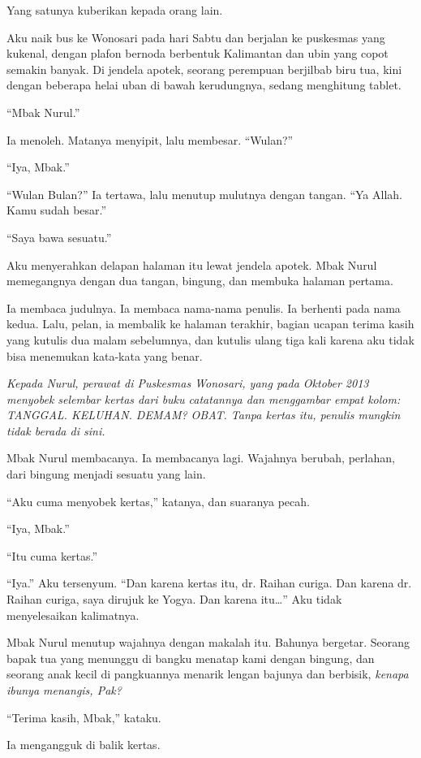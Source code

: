 \documentclass[11pt,twoside,openany]{book}
\makeatletter
\newcommand{\scenebreak}{\par\vspace{0.9em}{\centering\textsc{*\hspace{0.7em}*\hspace{0.7em}*}\par}\vspace{0.9em}\@afterindentfalse\@afterheading}
\makeatother
\begin{document}
\scenebreak
Yang satunya kuberikan kepada orang lain.

Aku naik bus ke Wonosari pada hari Sabtu dan berjalan ke puskesmas yang kukenal, dengan plafon bernoda berbentuk Kalimantan dan ubin yang copot semakin banyak. Di jendela apotek, seorang perempuan berjilbab biru tua, kini dengan beberapa helai uban di bawah kerudungnya, sedang menghitung tablet.

``Mbak Nurul.''

Ia menoleh. Matanya menyipit, lalu membesar. ``Wulan?''

``Iya, Mbak.''

``Wulan Bulan?'' Ia tertawa, lalu menutup mulutnya dengan tangan. ``Ya Allah. Kamu sudah besar.''

``Saya bawa sesuatu.''

Aku menyerahkan delapan halaman itu lewat jendela apotek. Mbak Nurul memegangnya dengan dua tangan, bingung, dan membuka halaman pertama.

Ia membaca judulnya. Ia membaca nama-nama penulis. Ia berhenti pada nama kedua. Lalu, pelan, ia membalik ke halaman terakhir, bagian ucapan terima kasih yang kutulis dua malam sebelumnya, dan kutulis ulang tiga kali karena aku tidak bisa menemukan kata-kata yang benar.

\emph{Kepada Nurul, perawat di Puskesmas Wonosari, yang pada Oktober 2013 menyobek selembar kertas dari buku catatannya dan menggambar empat kolom: TANGGAL. KELUHAN. DEMAM? OBAT. Tanpa kertas itu, penulis mungkin tidak berada di sini.}

Mbak Nurul membacanya. Ia membacanya lagi. Wajahnya berubah, perlahan, dari bingung menjadi sesuatu yang lain.

``Aku cuma menyobek kertas,'' katanya, dan suaranya pecah.

``Iya, Mbak.''

``Itu cuma kertas.''

``Iya.'' Aku tersenyum. ``Dan karena kertas itu, dr. Raihan curiga. Dan karena dr. Raihan curiga, saya dirujuk ke Yogya. Dan karena itu\ldots{}'' Aku tidak menyelesaikan kalimatnya.

Mbak Nurul menutup wajahnya dengan makalah itu. Bahunya bergetar. Seorang bapak tua yang menunggu di bangku menatap kami dengan bingung, dan seorang anak kecil di pangkuannya menarik lengan bajunya dan berbisik, \emph{kenapa ibunya menangis, Pak?}

``Terima kasih, Mbak,'' kataku.

Ia mengangguk di balik kertas.
\end{document}
